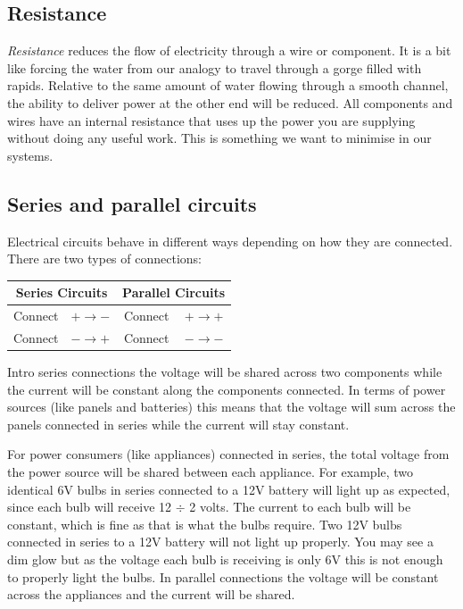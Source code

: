 \documentclass{article}
\theoremstyle{definition}
\theoremstyle{definition}
\theoremstyle{remark}
\begin{document}

  {\color{blue}\subsection{Resistance}} %
  \label{sub:resistance}

    \textit{Resistance} reduces the flow of electricity through a wire or component. It is a bit like forcing the water from our analogy to travel through a gorge filled with rapids. Relative to the same amount of water flowing through a smooth channel, the ability to deliver power at the other end will be reduced. All components and wires have an internal resistance that uses up the power you are supplying without doing any useful work. This is something we want to minimise in our systems. 
  

  {\color{blue}\subsection{Series and parallel circuits}} %
  \label{sub:series_and_parallel_circuits}

    Electrical circuits behave in different ways depending on how they are connected. There are two types of connections: 

      \begin{table}[!ht]
        \centering
        \begin{tabular}{|| c | c | c | c ||}
          \hline
          \multicolumn{2}{|c|}{Series Circuits}  & \multicolumn{2}{|c|}{Parallel Circuits}  \\
          \hline \hline
          Connect & $+ \rightarrow -$ & Connect & $+ \rightarrow +$ \\
          \hline
          Connect & $- \rightarrow +$ & Connect & $- \rightarrow -$ \\
          \hline
        \end{tabular}
        \label{table:two_types_of_connections}
      \end{table}

    Intro series connections the voltage will be shared across two components while the current will be constant along the components connected. In terms of power sources (like panels and batteries) this means that the voltage will sum across the panels connected in series while the current will stay constant. 

    For power consumers (like appliances) connected in series, the total voltage from the power source will be shared between each appliance. For example, two identical 6V bulbs in series connected to a 12V battery will light up as expected, since each bulb will receive 12 \(\div\) 2 volts. The current to each bulb will be constant, which is fine as that is what the bulbs require. Two 12V bulbs connected in series to a 12V battery will not light up properly. You may see a dim glow but as the voltage each bulb is receiving is only 6V this is not enough to properly light the bulbs. In parallel connections the voltage will be constant across the appliances and the current will be shared.
\end{document}
